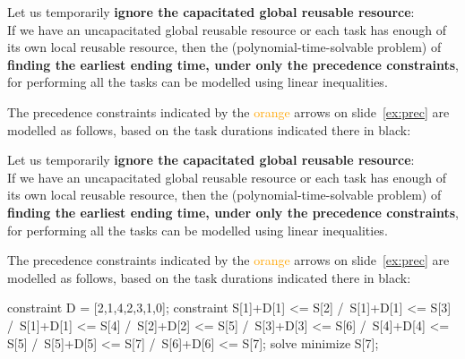 \documentclass{cons-beamer}
\begin{document}
\begin{flashcardcpmpy}
\begin{frame}%
  Let us temporarily \textbf{ ignore the capacitated global reusable resource}: \\
  If we have an uncapacitated global reusable resource or each task
  has enough of its own local reusable resource, then the
  (polynomial-time-solvable problem) of \textbf{finding the earliest ending
  time, under only the precedence constraints}, for performing all the
  tasks can be modelled using linear inequalities.
  \vfill

  \begin{example}[continued]
    The precedence constraints indicated by the
    \textcolor{Orange}{orange} arrows on slide~\ref{ex:prec} are
    modelled as follows, based on the task durations indicated there
    in black: 
    
    
  \end{example}
\end{frame}
\end{flashcardcpmpy}
\begin{flashcardminizinc}
\begin{frame}[fragile]%
  Let us temporarily \textbf{ ignore the capacitated global reusable resource}: \\
  If we have an uncapacitated global reusable resource or each task
  has enough of its own local reusable resource, then the
  (polynomial-time-solvable problem) of \textbf{finding the earliest ending
  time, under only the precedence constraints}, for performing all the
  tasks can be modelled using linear inequalities.
  \vfill

  \begin{example}[continued]
    The precedence constraints indicated by the
    \textcolor{Orange}{orange} arrows on slide~\ref{ex:prec} are
    modelled as follows, based on the task durations indicated there
    in black: 
    
    \begin{mzn}
constraint D = [2,1,4,2,3,1,0];
constraint S[1]+D[1] <= S[2] /\ S[1]+D[1] <= S[3]
        /\ S[1]+D[1] <= S[4] /\ S[2]+D[2] <= S[5]
        /\ S[3]+D[3] <= S[6] /\ S[4]+D[4] <= S[5]
        /\ S[5]+D[5] <= S[7] /\ S[6]+D[6] <= S[7];
solve minimize S[7];
    \end{mzn}
  \end{example}
\end{frame}
\end{flashcardminizinc}
\end{document}
